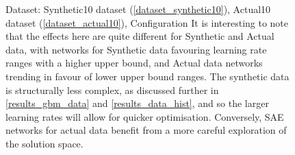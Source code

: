 \documentclass[a4paper,11pt,oneside]{article}
\theoremstyle{plain}
\theoremstyle{definition}
\begin{document}
\begin{figure}[H]
\begin{subfigure}{.5\textwidth}
		\label{figure-actual_mse_minmax_lr}
	\end{subfigure}
	\caption{Dataset: Synthetic10 dataset (\ref{dataset_synthetic10}), Actual10 dataset (\ref{dataset_actual10}), Configuration
		\newline It is interesting to  note that the effects here are quite different for Synthetic and Actual data, with networks for Synthetic data favouring learning rate ranges with a higher upper bound, and Actual data networks trending in favour of lower upper bound ranges. The synthetic data is structurally less complex, as discussed further in \ref{results_gbm_data} and \ref{results_data_hist}, and so the larger learning rates will allow for quicker optimisation. Conversely, SAE networks for actual data benefit from a more careful exploration of the solution space.}
	\label{figure-mse_lr}
\end{figure}
\end{document}
